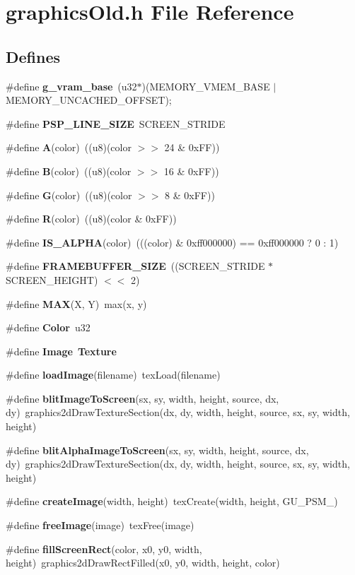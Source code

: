 \section{graphics\-Old.h File Reference}
\label{graphicsOld_8h}
\subsection*{Defines}
\begin{CompactItemize}
\item 
\#define {\bf g\_\-vram\_\-base}~(u32$\ast$)(MEMORY\_\-VMEM\_\-BASE $|$ MEMORY\_\-UNCACHED\_\-OFFSET);
\item 
\#define {\bf PSP\_\-LINE\_\-SIZE}~SCREEN\_\-STRIDE
\item 
\#define {\bf A}(color)~((u8)(color $>$$>$ 24 \& 0x\-FF))
\item 
\#define {\bf B}(color)~((u8)(color $>$$>$ 16 \& 0x\-FF))
\item 
\#define {\bf G}(color)~((u8)(color $>$$>$ 8 \& 0x\-FF))
\item 
\#define {\bf R}(color)~((u8)(color \& 0x\-FF))
\item 
\#define {\bf IS\_\-ALPHA}(color)~(((color) \& 0xff000000) == 0xff000000 ? 0 : 1)
\item 
\#define {\bf FRAMEBUFFER\_\-SIZE}~((SCREEN\_\-STRIDE $\ast$ SCREEN\_\-HEIGHT) $<$$<$ 2)
\item 
\#define {\bf MAX}(X, Y)~max(x, y)
\item 
\#define {\bf Color}~u32
\item 
\#define {\bf Image}~{\bf Texture}
\item 
\#define {\bf load\-Image}(filename)~tex\-Load(filename)
\item 
\#define {\bf blit\-Image\-To\-Screen}(sx, sy, width, height, source, dx, dy)~graphics2d\-Draw\-Texture\-Section(dx, dy, width, height, source, sx, sy, width, height)
\item 
\#define {\bf blit\-Alpha\-Image\-To\-Screen}(sx, sy, width, height, source, dx, dy)~graphics2d\-Draw\-Texture\-Section(dx, dy, width, height, source, sx, sy, width, height)
\item 
\#define {\bf create\-Image}(width, height)~tex\-Create(width, height, GU\_\-PSM\_)
\item 
\#define {\bf free\-Image}(image)~tex\-Free(image)
\item 
\#define {\bf fill\-Screen\-Rect}(color, x0, y0, width, height)~graphics2d\-Draw\-Rect\-Filled(x0, y0, width, height, color)

\end{CompactItemize}

